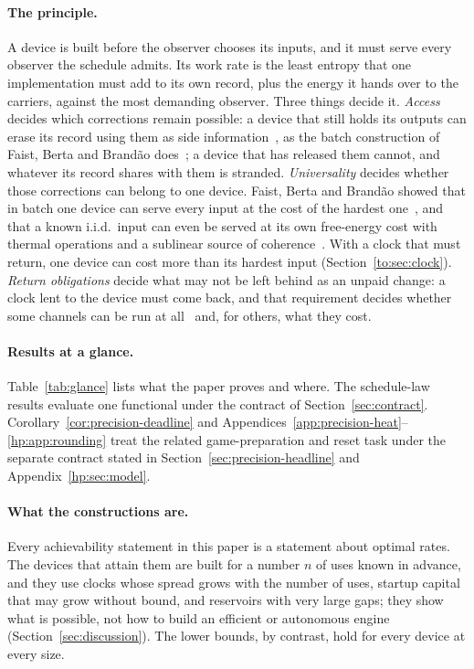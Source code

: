 \paragraph{The principle.} A device is built before the observer chooses its inputs, and it must serve every observer the schedule admits. Its work rate is the least entropy that one implementation must add to its own record, plus the energy it hands over to the carriers, against the most demanding observer. Three things decide it. \emph{Access} decides which corrections remain possible: a device that still holds its outputs can erase its record using them as side information~\cite{delRio11}, as the batch construction of Faist, Berta and Brand\~ao does~\cite[Sec.~7]{FBB21}; a device that has released them cannot, and whatever its record shares with them is stranded. \emph{Universality} decides whether those corrections can belong to one device. Faist, Berta and Brand\~ao showed that in batch one device can serve every input at the cost of the hardest one~\cite{FBB19,FBB21}, and that a known i.i.d.\ input can even be served at its own free-energy cost with thermal operations and a sublinear source of coherence~\cite[Prop.~8.3]{FBB21}. With a clock that must return, one device can cost more than its hardest input (Section~\ref{to:sec:clock}). \emph{Return obligations} decide what may not be left behind as an unpaid change: a clock lent to the device must come back, and that requirement decides whether some channels can be run at all~\cite{MarvianSpekkens19,LostaglioMuller19} and, for others, what they cost.

\paragraph{Results at a glance.} Table~\ref{tab:glance} lists what the paper proves and where. The schedule-law results evaluate one functional under the contract of Section~\ref{sec:contract}. Corollary~\ref{cor:precision-deadline} and Appendices~\ref{app:precision-heat}--\ref{hp:app:rounding} treat the related game-preparation and reset task under the separate contract stated in Section~\ref{sec:precision-headline} and Appendix~\ref{hp:sec:model}.

\paragraph{What the constructions are.} Every achievability statement in this paper is a statement about optimal rates. The devices that attain them are built for a number $n$ of uses known in advance, and they use clocks whose spread grows with the number of uses, startup capital that may grow without bound, and reservoirs with very large gaps; they show what is possible, not how to build an efficient or autonomous engine (Section~\ref{sec:discussion}). The lower bounds, by contrast, hold for every device at every size.

